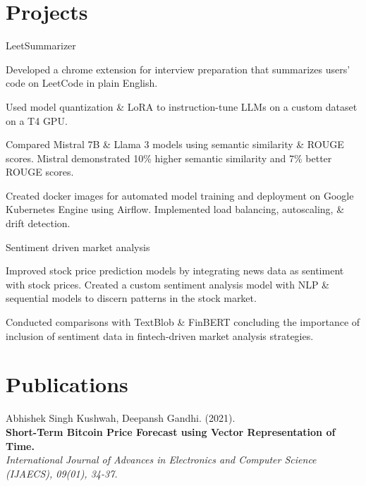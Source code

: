 \documentclass[letterpaper]{resume_config}
\begin{document}
\section{Projects}
\vspace{-1pt}
\WorkExperience
    {LeetSummarizer}%
    {} %
    {} %
    {\vspace{-13pt}} %
    {
        \item Developed a chrome extension for interview preparation that summarizes users' code on LeetCode in plain English.
        \item Used model quantization \& LoRA to instruction-tune LLMs on a custom dataset on a T4 GPU.
        \item Compared Mistral 7B \& Llama 3 models using semantic similarity \& ROUGE scores. Mistral demonstrated 10\% higher semantic similarity and 7\% better ROUGE scores.
        \item Created docker images for automated model training and deployment on Google Kubernetes Engine using Airflow. Implemented load balancing, autoscaling, \& drift detection.
    }

\vspace{1pt}

\WorkExperience
    {Sentiment driven market analysis}%
    {} %
    {} %
    {\vspace{-13pt}} %
    {
        \item Improved stock price prediction models by integrating news data as sentiment with stock prices. Created a custom sentiment analysis model with NLP \& sequential models to discern patterns in the stock market.
        \item Conducted comparisons with TextBlob \& FinBERT concluding the importance of inclusion of sentiment data in fintech-driven market analysis strategies.
    }

\vspace{-7pt}


\section{Publications}
\vspace{-1pt}


Abhishek Singh Kushwah, Deepansh Gandhi. (2021). \\
{\textbf{Short-Term Bitcoin Price Forecast using Vector Representation of Time.}} 
\\\textit{International Journal of Advances in Electronics and Computer Science (IJAECS), 09(01), 34-37.}
\end{document}
